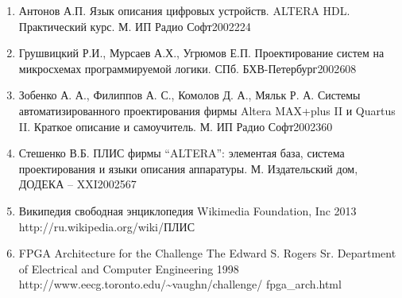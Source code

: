 %
%
{
\pagestyle{framedcontent}
\begin{enumerate}
\item \addBook
{Антонов А.П.}
{Язык описания цифровых устройств. ALTERA HDL. Практический курс.}
{М.}
{ИП Радио Софт}{2002}{224}
\item \addBook
{Грушвицкий Р.И., Мурсаев А.Х., Угрюмов Е.П.}
{Проектирование систем на микросхемах программируемой логики.}
{СПб.}
{БХВ-Петербург}{2002}{608}
\item \addBook
{Зобенко А. А., Филиппов А. С., Комолов Д. А., Мяльк Р. А.}
{Системы автоматизированного проектирования фирмы Altera MAX+plus II и Quartus II. Краткое описание и самоучитель.}
{М.}
{ИП Радио Софт}{2002}{360}
\item \addBook
{Стешенко В.Б.}
{ПЛИС фирмы “ALTERA”: элементая база, система проектирования и языки описания аппаратуры.}
{М.}
{Издательский дом, ДОДЕКА -- XXI}{2002}{567}
\item \addURL
{Википедия свободная энциклопедия}
{Wikimedia Foundation, Inc}
{2013}
{http://ru.wikipedia.org/wiki/ПЛИС}
\item \addURL
{FPGA Architecture for the Challenge}
{The Edward S. Rogers Sr. Department of Electrical and Computer Engineering}
{1998}
{http://www.eecg.toronto.edu/\~{}vaughn/challenge/ fpga\_arch.html}
\label{literarure:num}
\end{enumerate}
\vfill
\newpage
}